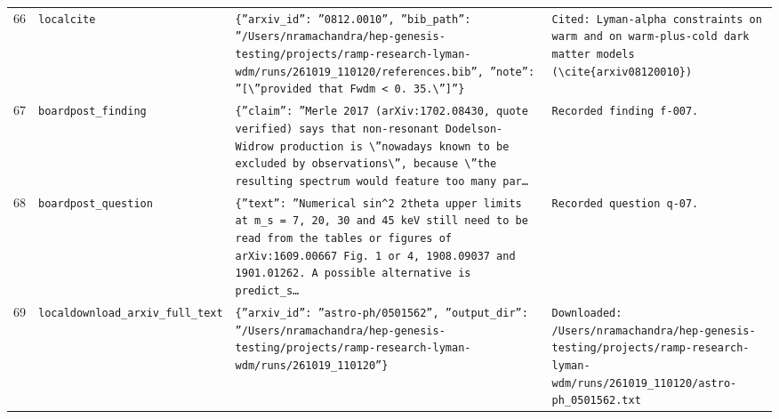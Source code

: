 \documentclass[11pt,a4paper]{article}
\begin{document}
\begin{longtable}{@{}p{}p{}p{}p{}@{}}
66 & \texttt{local}\newline\texttt{cite} & \texttt{\{''arxiv\_\allowbreak{}id'':\allowbreak{} ''0812.0010'',\allowbreak{} ''bib\_\allowbreak{}path'':\allowbreak{} ''/\allowbreak{}Users/\allowbreak{}nramachandra/\allowbreak{}hep-genesis-testing/\allowbreak{}projects/\allowbreak{}ramp-research-lyman-wdm/\allowbreak{}runs/\allowbreak{}261019\_\allowbreak{}110120/\allowbreak{}references.bib'',\allowbreak{} ''note'':\allowbreak{} ''[\textbackslash{}\allowbreak{}''provided that Fwdm \textless{}\allowbreak{} 0. 35.\textbackslash{}\allowbreak{}'']\allowbreak{}''\}\allowbreak{}} & \texttt{Cited:\allowbreak{} Lyman-alpha constraints on warm and on warm-plus-cold dark matter models (\textbackslash{}\allowbreak{}cite\{arxiv08120010\}\allowbreak{})\allowbreak{}} \\
67 & \texttt{board}\newline\texttt{post\_\allowbreak{}finding} & \texttt{\{''claim'':\allowbreak{} ''Merle 2017 (arXiv:\allowbreak{}1702.08430,\allowbreak{} quote verified)\allowbreak{} says that non-resonant Dodelson-Widrow production is \textbackslash{}\allowbreak{}''nowadays known to be excluded by observations\textbackslash{}\allowbreak{}'',\allowbreak{} because \textbackslash{}\allowbreak{}''the resulting spectrum would feature too many par\ldots{}\allowbreak{}} & \texttt{Recorded finding f-007.} \\
68 & \texttt{board}\newline\texttt{post\_\allowbreak{}question} & \texttt{\{''text'':\allowbreak{} ''Numerical sin\textasciicircum{}\allowbreak{}2 2theta upper limits at m\_\allowbreak{}s =\allowbreak{} 7,\allowbreak{} 20,\allowbreak{} 30 and 45 keV still need to be read from the tables or figures of arXiv:\allowbreak{}1609.00667 Fig. 1 or 4,\allowbreak{} 1908.09037 and 1901.01262. A possible alternative is predict\_\allowbreak{}s\ldots{}\allowbreak{}} & \texttt{Recorded question q-07.} \\
69 & \texttt{local}\newline\texttt{download\_\allowbreak{}arxiv\_\allowbreak{}full\_\allowbreak{}text} & \texttt{\{''arxiv\_\allowbreak{}id'':\allowbreak{} ''astro-ph/\allowbreak{}0501562'',\allowbreak{} ''output\_\allowbreak{}dir'':\allowbreak{} ''/\allowbreak{}Users/\allowbreak{}nramachandra/\allowbreak{}hep-genesis-testing/\allowbreak{}projects/\allowbreak{}ramp-research-lyman-wdm/\allowbreak{}runs/\allowbreak{}261019\_\allowbreak{}110120''\}\allowbreak{}} & \texttt{Downloaded:\allowbreak{} /\allowbreak{}Users/\allowbreak{}nramachandra/\allowbreak{}hep-genesis-testing/\allowbreak{}projects/\allowbreak{}ramp-research-lyman-wdm/\allowbreak{}runs/\allowbreak{}261019\_\allowbreak{}110120/\allowbreak{}astro-ph\_\allowbreak{}0501562.txt} \\

\end{longtable}
\end{document}
